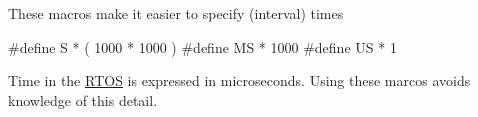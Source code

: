 These macro\textquotesingle{}s make it easier to specify (interval) times


\begin{DoxyCode}
\textcolor{preprocessor}{#define  S * ( 1000 * 1000 )}
\textcolor{preprocessor}{#define MS * 1000}
\textcolor{preprocessor}{#define US * 1}
\end{DoxyCode}


Time in the \hyperlink{class_r_t_o_s}{R\+T\+OS} is expressed in microseconds. Using these marco\textquotesingle{}s avoids knowledge of this detail. 